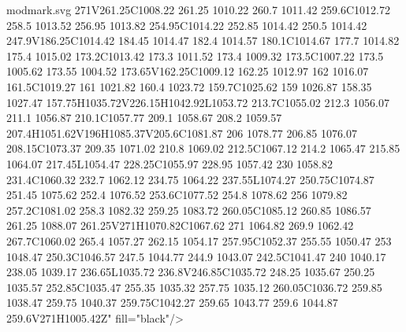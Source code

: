 \begin{filecontents}[noheader]{modmark.svg}
271V261.25C1008.22 261.25 1010.22 260.7 1011.42 259.6C1012.72 258.5 1013.52 256.95 1013.82 254.95C1014.22 252.85 1014.42 250.5 1014.42 247.9V186.25C1014.42 184.45 1014.47 182.4 1014.57 180.1C1014.67 177.7 1014.82 175.4 1015.02 173.2C1013.42 173.3 1011.52 173.4 1009.32 173.5C1007.22 173.5 1005.62 173.55 1004.52 173.65V162.25C1009.12 162.25 1012.97 162 1016.07 161.5C1019.27 161 1021.82 160.4 1023.72 159.7C1025.62 159 1026.87 158.35 1027.47 157.75H1035.72V226.15H1042.92L1053.72 213.7C1055.02 212.3 1056.07 211.1 1056.87 210.1C1057.77 209.1 1058.67 208.2 1059.57 207.4H1051.62V196H1085.37V205.6C1081.87 206 1078.77 206.85 1076.07 208.15C1073.37 209.35 1071.02 210.8 1069.02 212.5C1067.12 214.2 1065.47 215.85 1064.07 217.45L1054.47 228.25C1055.97 228.95 1057.42 230 1058.82 231.4C1060.32 232.7 1062.12 234.75 1064.22 237.55L1074.27 250.75C1074.87 251.45 1075.62 252.4 1076.52 253.6C1077.52 254.8 1078.62 256 1079.82 257.2C1081.02 258.3 1082.32 259.25 1083.72 260.05C1085.12 260.85 1086.57 261.25 1088.07 261.25V271H1070.82C1067.62 271 1064.82 269.9 1062.42 267.7C1060.02 265.4 1057.27 262.15 1054.17 257.95C1052.37 255.55 1050.47 253 1048.47 250.3C1046.57 247.5 1044.77 244.9 1043.07 242.5C1041.47 240 1040.17 238.05 1039.17 236.65L1035.72 236.8V246.85C1035.72 248.25 1035.67 250.25 1035.57 252.85C1035.47 255.35 1035.32 257.75 1035.12 260.05C1036.72 259.85 1038.47 259.75 1040.37 259.75C1042.27 259.65 1043.77 259.6 1044.87 259.6V271H1005.42Z" fill="black"/>

\end{filecontents}
